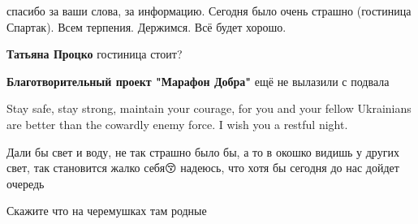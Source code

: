 спасибо за ваши слова, за информацию. Сегодня было очень страшно (гостиница
Спартак). Всем терпения. Держимся. Всё будет хорошо.

\begin{itemize} %
\textbf{Татьяна Процко} гостиница стоит?

\textbf{Благотворительный проект "Марафон Добра"} ещё не вылазили с подвала
\end{itemize} %


Stay safe, stay strong, maintain your courage, for you and your fellow
Ukrainians are better than the cowardly enemy force. I wish you a restful
night.


Дали бы свет и воду, не так страшно было бы, а то в окошко видишь у других
свет, так становится жалко себя😚 надеюсь, что хотя бы сегодня до нас дойдет
очередь


Скажите что на черемушках там родные

